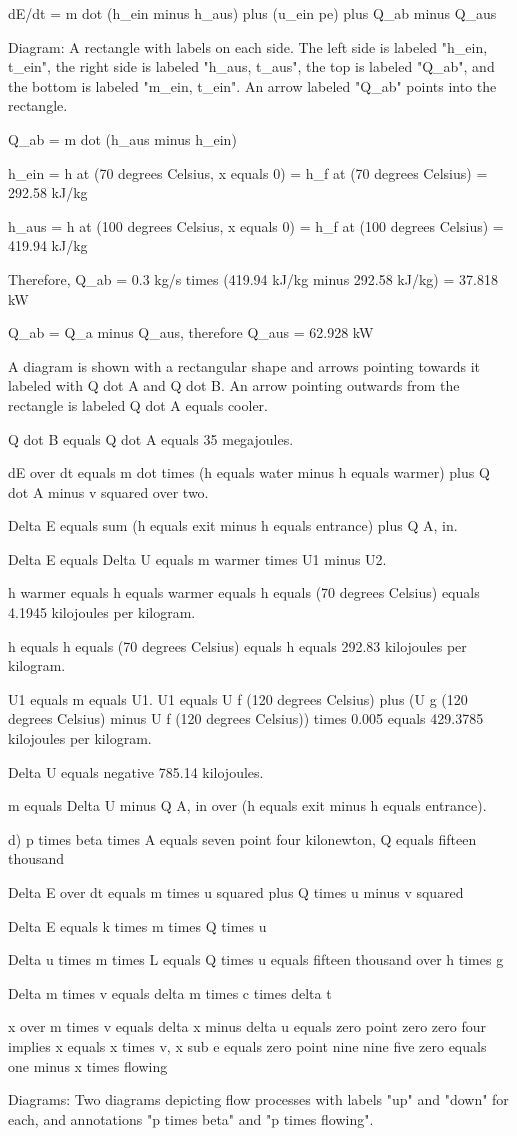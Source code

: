 dE/dt = m dot (h_ein minus h_aus) plus (u_ein pe) plus Q_ab minus Q_aus

Diagram: A rectangle with labels on each side. The left side is labeled "h_ein, t_ein", the right side is labeled "h_aus, t_aus", the top is labeled "Q_ab", and the bottom is labeled "m_ein, t_ein". An arrow labeled "Q_ab" points into the rectangle.

Q_ab = m dot (h_aus minus h_ein)

h_ein = h at (70 degrees Celsius, x equals 0) = h_f at (70 degrees Celsius) = 292.58 kJ/kg

h_aus = h at (100 degrees Celsius, x equals 0) = h_f at (100 degrees Celsius) = 419.94 kJ/kg

Therefore, Q_ab = 0.3 kg/s times (419.94 kJ/kg minus 292.58 kJ/kg) = 37.818 kW

Q_ab = Q_a minus Q_aus, therefore Q_aus = 62.928 kW

A diagram is shown with a rectangular shape and arrows pointing towards it labeled with Q dot A and Q dot B. An arrow pointing outwards from the rectangle is labeled Q dot A equals cooler.

Q dot B equals Q dot A equals 35 megajoules.

dE over dt equals m dot times (h equals water minus h equals warmer) plus Q dot A minus v squared over two.

Delta E equals sum (h equals exit minus h equals entrance) plus Q A, in.

Delta E equals Delta U equals m warmer times U1 minus U2.

h warmer equals h equals warmer equals h equals (70 degrees Celsius) equals 4.1945 kilojoules per kilogram.

h equals h equals (70 degrees Celsius) equals h equals 292.83 kilojoules per kilogram.

U1 equals m equals U1. U1 equals U f (120 degrees Celsius) plus (U g (120 degrees Celsius) minus U f (120 degrees Celsius)) times 0.005 equals 429.3785 kilojoules per kilogram.

Delta U equals negative 785.14 kilojoules.

m equals Delta U minus Q A, in over (h equals exit minus h equals entrance).

d) p times beta times A equals seven point four kilonewton, Q equals fifteen thousand

Delta E over dt equals m times u squared plus Q times u minus v squared

Delta E equals k times m times Q times u

Delta u times m times L equals Q times u equals fifteen thousand over h times g

Delta m times v equals delta m times c times delta t

x over m times v equals delta x minus delta u equals zero point zero zero four implies x equals x times v, x sub e equals zero point nine nine five zero equals one minus x times flowing

Diagrams:
Two diagrams depicting flow processes with labels "up" and "down" for each, and annotations "p times beta" and "p times flowing".